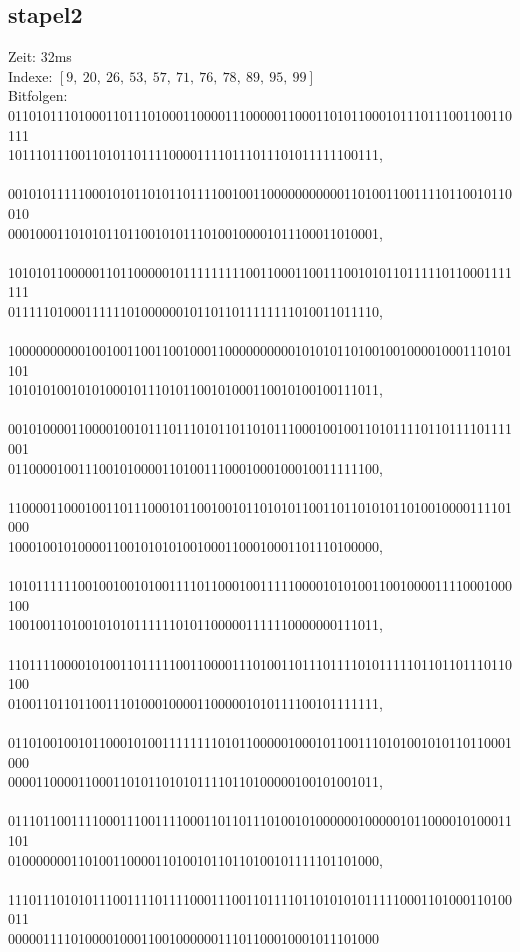 \documentclass[a4paper,10pt,ngerman]{scrartcl}
\begin{document}
{\subsection{stapel2}
Zeit: 32ms \\
Indexe: $[9, \ 20, \ 26, \ 53, \ 57, \ 71, \ 76, \ 78, \ 89, \ 95, \ 99]$ \\
Bitfolgen: \\
011010111010001101110100011000011100000110001101011000101110111001100110111 \\
10111011100110101101111000011110111011101011111100111, \\\\
001010111110001010110101101111001001100000000000110100110011110110010110010 \\
00010001101010110110010101110100100001011100011010001, \\\\
101010110000011011000001011111111100110001100111001010110111110110001111111 \\
01111101000111111010000001011011011111111010011011110, \\\\
100000000001001001100110010001100000000001010101101001001000010001110101101 \\
10101010010101000101110101100101000110010100100111011, \\\\
001010000110000100101110111010110110101110001001001101011110110111101111001 \\
01100001001110010100001101001110001000100010011111100, \\\\
110000110001001101110001011001001011010101100110110101011010010000111101000 \\
10001001010000110010101010010001100010001101110100000, \\\\
101011111100100100101001111011000100111110000101010011001000011110001000100 \\
10010011010010101011111101011000001111110000000111011, \\\\
110111100001010011011111001100001110100110111011110101111101101101110110100 \\
01001101101100111010001000011000001010111100101111111, \\\\
011010010010110001010011111111010110000010001011001110101001010110110001000 \\
00001100001100011010110101011110110100000100101001011, \\\\
011101100111100011100111100011011011101001010000001000001011000010100011101 \\
01000000011010011000011010010110110100101111101101000, \\\\
111011101010111001111011110001110011011110110101010111110001101000110100011 \\
00000111101000010001100100000011101100010001011101000

}
\end{document}
